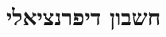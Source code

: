 \documentclass{article}
\begin{document}









\newpage
\section*{חשבון דיפרנציאלי}
\end{document}
